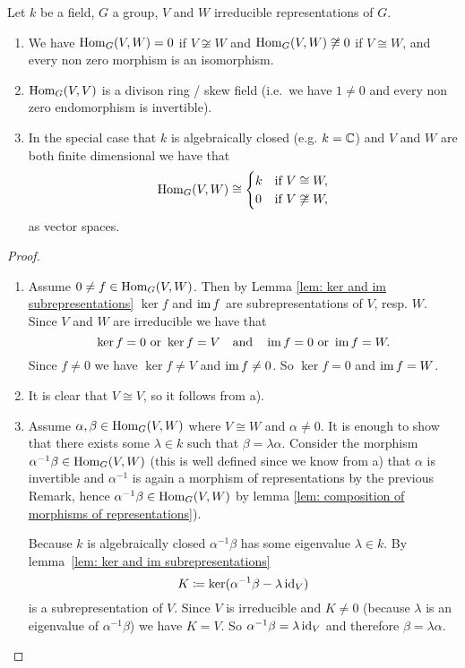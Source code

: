 \begin{lem}
 Let $k$ be a field, $G$ a group, $V$ and $W$ irreducible representations of $G$.
 \begin{enumerate}[label=\emph{\alph*)},leftmargin=*]
  \item
   We have $\operatorname{Hom}_G(V,W) = 0$ if $V \not\cong W$ and $\operatorname{Hom}_G(V,W) \not\cong 0$ if $V \cong W$, and every non zero morphism is an isomorphism.
  \item
   $\operatorname{Hom}_G(V,V)$ is a divison ring / skew field (i.e.\ we have $1 \neq 0$ and every non zero endomorphism is invertible).
  \item
   In the special case that $k$ is algebraically closed (e.g. $k = \mathbb{C}$) and $V$ and $W$ are both finite dimensional we have that
   \[
    \operatorname{Hom}_G(V,W) \cong
    \begin{cases}
     k & \text{if } V \cong W, \\
     0 & \text{if } V \not\cong W,
    \end{cases}
   \]
   as vector spaces.
 \end{enumerate}
\end{lem}
\begin{proof}
 \begin{enumerate}[label=\emph{\alph*)},leftmargin=*]
  \item 
   Assume $0 \neq f \in \operatorname{Hom}_G(V,W)$. Then by Lemma \ref{lem: ker and im subrepresentations} $\ker f$ and $\operatorname{im} f$ are subrepresentations of $V$, resp. $W$. Since $V$ and $W$ are irreducible we have that
   \[
    \ker f = 0 \text{ or } \ker f = V \quad \text{and} \quad \operatorname{im} f = 0 \text{ or } \operatorname{im} f = W.
   \]
   Since $f \neq 0$ we have $\ker f \neq V$ and $\operatorname{im} f \neq 0$. So $\ker f = 0$ and $\operatorname{im} f = W$.
  \item
   It is clear that $V \cong V$, so it follows from a).
  \item
   Assume $\alpha, \beta \in \operatorname{Hom}_G(V,W)$ where $V \cong W$ and $\alpha \neq 0$. It is enough to show that there exists some $\lambda \in k$ such that $\beta = \lambda \alpha$. Consider the morphism $\alpha^{-1} \beta \in \operatorname{Hom}_G(V,W)$ (this is well defined since we know from a) that $\alpha$ is invertible and $\alpha^{-1}$ is again a morphism of representations by the previous Remark, hence $\alpha^{-1} \beta \in \operatorname{Hom}_G(V,W)$ by lemma \ref{lem: composition of morphisms of representations}).
   
   Because $k$ is algebraically closed $\alpha^{-1} \beta$ has some eigenvalue $\lambda \in k$. By \mbox{lemma \ref{lem: ker and im subrepresentations}}
   \[
    K \coloneqq \ker(\alpha^{-1} \beta - \lambda \operatorname{id}_V)
   \]
   is a subrepresentation of $V$. Since $V$ is irreducible and $K \neq 0$ (because $\lambda$ is an eigenvalue of $\alpha^{-1} \beta$) we have $K = V$. So $\alpha^{-1} \beta = \lambda \operatorname{id}_V$ and therefore $\beta = \lambda \alpha$.
  \qedhere
 \end{enumerate}
\end{proof}



